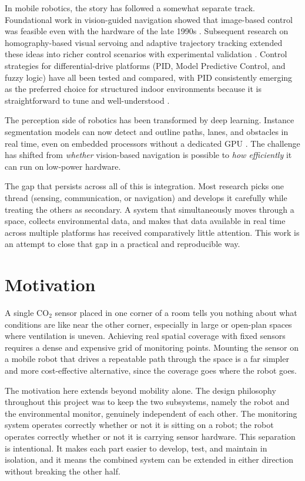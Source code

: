 In mobile robotics, the story has followed a somewhat separate track.
Foundational work in vision-guided navigation showed that image-based
control was feasible even with the hardware of the late 1990s
\cite{r5}. Subsequent research on homography-based visual servoing
and adaptive trajectory tracking extended these ideas into richer
control scenarios with experimental validation \cite{r6,r7,r8}.
Control strategies for differential-drive platforms (PID, Model
Predictive Control, and fuzzy logic) have all been tested and compared,
with PID consistently emerging as the preferred choice for structured
indoor environments because it is straightforward to tune and
well-understood \cite{r9,r10,r11}.

The perception side of robotics has been transformed by deep learning.
Instance segmentation models can now detect and outline paths, lanes,
and obstacles in real time, even on embedded processors without a
dedicated GPU \cite{r12,r13}. The challenge has shifted from
\emph{whether} vision-based navigation is possible to \emph{how
efficiently} it can run on low-power hardware.

The gap that persists across all of this is integration. Most research
picks one thread (sensing, communication, or navigation) and develops
it carefully while treating the others as secondary. A system that
simultaneously moves through a space, collects environmental data, and
makes that data available in real time across multiple platforms has
received comparatively little attention. This work is an attempt to
close that gap in a practical and reproducible way.

\section{Motivation}

A single CO$_2$ sensor placed in one corner of a room tells you
nothing about what conditions are like near the other corner, especially
in large or open-plan spaces where ventilation is uneven. Achieving
real spatial coverage with fixed sensors requires a dense and expensive
grid of monitoring points. Mounting the sensor on a mobile robot that
drives a repeatable path through the space is a far simpler and more
cost-effective alternative, since the coverage goes where the robot goes.

The motivation here extends beyond mobility alone. The design
philosophy throughout this project was to keep the two subsystems,
namely the robot and the environmental monitor, genuinely independent of each
other. The monitoring system operates correctly whether or not it is
sitting on a robot; the robot operates correctly whether or not it is
carrying sensor hardware. This separation is intentional. It makes
each part easier to develop, test, and maintain in isolation, and it
means the combined system can be extended in either direction without
breaking the other half.

